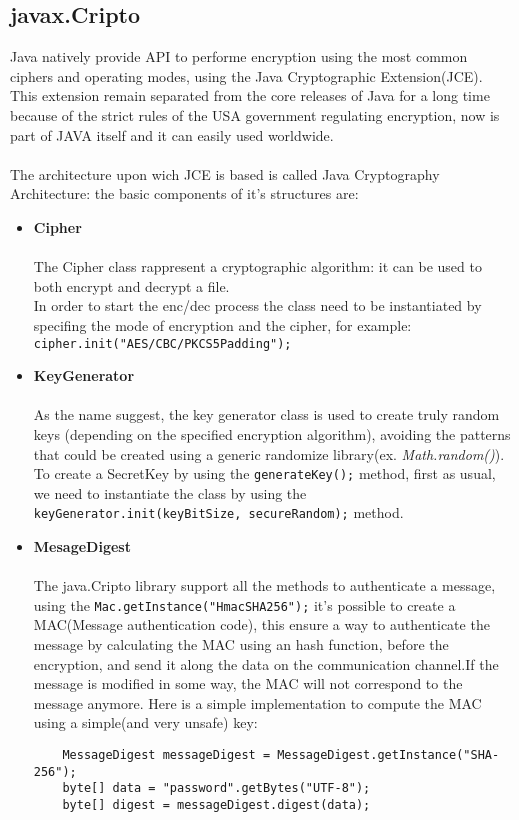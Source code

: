 \documentclass{article}
\begin{document}
\subsection{javax.Cripto}
Java natively provide API to performe encryption using the most common ciphers and operating modes, using the Java Cryptographic Extension(JCE).\\This extension remain separated  from the core releases of Java for a long time because of the strict rules of the USA government regulating encryption, now is part of JAVA itself and it can easily used worldwide.\\\\The architecture upon wich JCE is based is called Java Cryptography Architecture: the basic components of it's structures are:
\begin{itemize}

  \item \textbf{Cipher}\\\\
  	The Cipher class rappresent a cryptographic algorithm: it can be used to both encrypt and decrypt a file.\\In order to start the enc/dec process the class need to be instantiated by specifing the mode of encryption and the cipher, for example:\\ \verb+cipher.init("AES/CBC/PKCS5Padding");+
 	\item \textbf{KeyGenerator}\\\\
	As the name suggest, the key generator class is used to create truly random keys (depending on the specified encryption algorithm), avoiding the patterns that could be created using a generic randomize library(ex. \textit{Math.random()}). To create a SecretKey by using the \verb+generateKey();+ method, first as usual, we need to instantiate the class by using the \verb+keyGenerator.init(keyBitSize, secureRandom);+
	method.
	\item \textbf{MesageDigest}\\\\
	The java.Cripto library support all the methods to authenticate a message, using the \verb+Mac.getInstance("HmacSHA256");+ it's possible to create a MAC(Message authentication code), this ensure a way to authenticate the message by calculating the MAC using an hash function, before the encryption, and send it along the data on the communication channel.If the message is modified in some way, the MAC will not correspond to the message anymore. Here is a simple implementation to compute the MAC using a simple(and very unsafe) key:
	\begin{verbatim}
	MessageDigest messageDigest = MessageDigest.getInstance("SHA-256");
	byte[] data = "password".getBytes("UTF-8");
	byte[] digest = messageDigest.digest(data);
	\end{verbatim}
\end{itemize}
	
\end{document}
